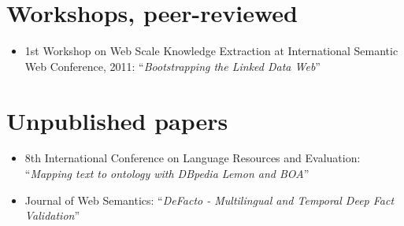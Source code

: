 \section*{Workshops, peer-reviewed}
\begin{itemize}
    \item 1st Workshop on Web Scale Knowledge Extraction at International Semantic Web Conference, 2011: ``\textit{Bootstrapping the Linked Data Web}'' \citep{Gerber2011}
\end{itemize}

\section*{Unpublished papers}
\begin{itemize}
    \item 8th International Conference on Language Resources and Evaluation: ``\textit{Mapping text to ontology with DBpedia Lemon and BOA}'' \citep{lukovnikov14}
   \item Journal of Web Semantics: ``\textit{DeFacto - Multilingual and Temporal Deep Fact Validation}'' \citep{gerber13c}
\end{itemize}
%